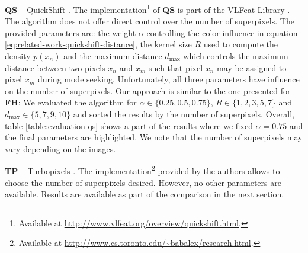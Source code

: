 \textbf{QS} -- QuickShift \cite{VedaldiSoatto:2008}. The implementation\footnote{Available at \url{http://www.vlfeat.org/overview/quickshift.html}.} of \textbf{QS} is part of the VLFeat Library \cite{VedaldiFulkerson:2008}. The algorithm does not offer direct control over the number of superpixels. The provided parameters are: the weight $\alpha$ controlling the color influence in equation \eqref{eq:related-work-quickshift-distance}, the kernel size $R$ used to compute the density $p(x_n)$ and the maximum distance $d_{\text{max}}$ which controls the maximum distance between two pixels $x_n$ and $x_m$ such that pixel $x_n$ may be assigned to pixel $x_m$ during mode seeking. Unfortunately, all three parameters have influence on the number of superpixels. Our approach is similar to the one presented for \textbf{FH}: We evaluated the algorithm for $\alpha \in \{0.25,0.5,0.75\}$, $R \in \{1,2,3,5,7\}$ and $d_{\text{max}} \in \{5,7,9,10\}$ and sorted the results by the number of superpixels. Overall, table \ref{table:evaluation-qs} shows a part of the results where we fixed $\alpha = 0.75$ and the final parameters are highlighted. We note that the number of superpixels may vary depending on the images. %

\textbf{TP} -- Turbopixels \cite{LevinshteinStereKutulakosFleetDickinsonSiddiqi:2009}. The implementation\footnote{Available at \url{http://www.cs.toronto.edu/~babalex/research.html}.} provided by the authors allows to choose the number of superpixels desired. However, no other parameters are available. Results are available as part of the comparison in the next section.

